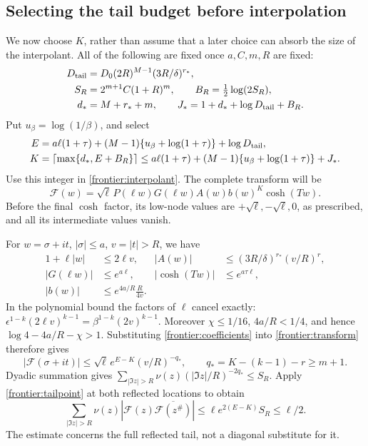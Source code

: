 \subsection{Selecting the tail budget before interpolation}
We now choose \(K\), rather than assume that a later choice can
absorb the size of the interpolant. All of the following are fixed
once \(a,C,m,R\) are fixed:
\[
 \begin{split}
 D_{\rm tail}&=D_0(2R)^{M-1}(3R/\delta)^{r_*},\\
 S_R&=2^{m+1}C(1+R)^m,\qquad B_R=\tfrac12\log(2S_R),\\
 d_*&=M+r_*+m,\qquad J_*=1+d_*+\log D_{\rm tail}+B_R.
 \end{split}
\]
Put \(u_\beta=\log(1/\beta)\), and select
\begin{equation}\label{frontier:K}
 \begin{split}
 E&=a\ell(1+\tau)+(M-1)\{u_\beta+\log(1+\tau)\}
                      +\log D_{\rm tail},\\
 K&=\left\lceil\max\{d_*,E+B_R\}\right\rceil
 \le a\ell(1+\tau)+(M-1)\{u_\beta+\log(1+\tau)\}+J_*.
 \end{split}
\end{equation}
Use this integer in \eqref{frontier:interpolant}. The complete
transform will be
\begin{equation}\label{frontier:transform}
 \mathcal F(w)=\sqrt\ell\,P(\ell w)G(\ell w)A(w)b(w)^K\cosh(Tw).
\end{equation}
Before the final \(\cosh\) factor, its low-node values are
\(+\sqrt\ell,-\sqrt\ell,0\), as prescribed, and all its
intermediate values vanish.

For \(w=\sigma+it\), \(|\sigma|\le a\), \(v=|t|>R\),
we have
\[
 \begin{aligned}
 1+\ell|w|&\le2\ell v,&
 |A(w)|&\le(3R/\delta)^{r_*}(v/R)^r,\\
 |G(\ell w)|&\le e^{a\ell},&
 |\cosh(Tw)|&\le e^{a\tau\ell},\\
 |b(w)|&\le e^{4a/R}\frac R{4v}.&&
 \end{aligned}
\]
In the polynomial bound the factors of \(\ell\) cancel exactly:
\(\epsilon^{1-k}(2\ell v)^{k-1}=\beta^{1-k}(2v)^{k-1}\).
Moreover \(\chi\le1/16\), \(4a/R<1/4\), and hence
\(\log4-4a/R-\chi>1\). Substituting
\eqref{frontier:coefficients} into \eqref{frontier:transform}
therefore gives
\begin{equation}\label{frontier:tailpoint}
 |\mathcal F(\sigma+it)|\le
 \sqrt\ell\,e^{E-K}(v/R)^{-q_*},\qquad
 q_*=K-(k-1)-r\ge m+1.
\end{equation}
Dyadic summation gives
\(\sum_{|\Im z|>R}\nu(z)(|\Im z|/R)^{-2q_*}\le S_R\).
Apply \eqref{frontier:tailpoint} at both reflected locations to obtain
\begin{equation}\label{frontier:tail}
 \sum_{|\Im z|>R}\nu(z)
  |\mathcal F(z)\overline{\mathcal F(z^\#)}|
 \le\ell e^{2(E-K)}S_R\le\ell/2.
\end{equation}
The estimate concerns the full reflected tail, not a diagonal
substitute for it.

